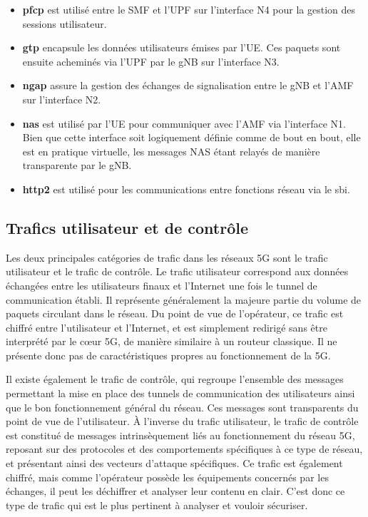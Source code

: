 \documentclass[a4paper,11pt,twoside]{StyleThese}
\begin{document}
\begin{itemize}
    \item \textbf{\gls{pfcp}} est utilisé entre le SMF et l'UPF sur l’interface N4 pour la gestion des sessions utilisateur.
    \item \textbf{\gls{gtp}} encapsule les données utilisateurs émises par l’UE. Ces paquets sont ensuite acheminés via l'UPF par le gNB sur l’interface N3.
    \item \textbf{\gls{ngap}} assure la gestion des échanges de signalisation entre le gNB et l’AMF sur l’interface N2.
    \item \textbf{\gls{nas}} est utilisé par l’UE pour communiquer avec l’AMF via l’interface N1. Bien que cette interface soit logiquement définie comme de bout en bout, elle est en pratique virtuelle, les messages NAS étant relayés de manière transparente par le gNB.
    \item \textbf{\gls{http2}} est utilisé pour les communications entre fonctions réseau via le \gls{sbi}.
\end{itemize}

\subsection{Trafics utilisateur et de contrôle}
Les deux principales catégories de trafic dans les réseaux 5G sont le trafic utilisateur et le trafic de contrôle. Le trafic utilisateur correspond aux données échangées entre les utilisateurs finaux et l’Internet une fois le tunnel de communication établi. Il représente généralement la majeure partie du volume de paquets circulant dans le réseau. Du point de vue de l’opérateur, ce trafic est chiffré entre l’utilisateur et l’Internet, et est simplement redirigé sans être interprété par le cœur 5G, de manière similaire à un routeur classique. Il ne présente donc pas de caractéristiques propres au fonctionnement de la 5G.

Il existe également le trafic de contrôle, qui regroupe l’ensemble des messages permettant la mise en place des tunnels de communication des utilisateurs ainsi que le bon fonctionnement général du réseau. Ces messages sont transparents du point de vue de l’utilisateur. À l’inverse du trafic utilisateur, le trafic de contrôle est constitué de messages intrinsèquement liés au fonctionnement du réseau 5G, reposant sur des protocoles et des comportements spécifiques à ce type de réseau, et présentant ainsi des vecteurs d’attaque spécifiques. Ce trafic est également chiffré, mais comme l’opérateur possède les équipements concernés par les échanges, il peut les déchiffrer et analyser leur contenu en clair. C’est donc ce type de trafic qui est le plus pertinent à analyser et vouloir sécuriser.
\end{document}

